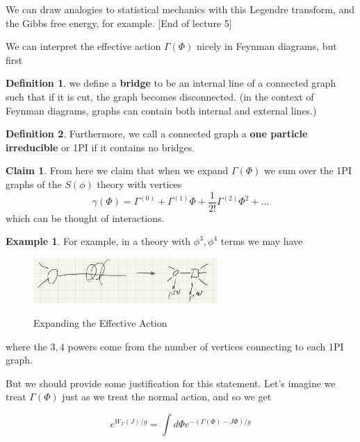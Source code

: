 \documentclass{article}
\theoremstyle{definition}
\newtheorem{definition}{Definition}
\newtheorem{example}{Example}
\newtheorem{claim}{Claim}
\begin{document}
We can draw analogies to statistical mechanics with this Legendre transform, and
the Gibbs free energy, for example. [End of lecture 5]

We can interpret the effective action $\Gamma(\Phi)$ nicely in Feynman diagrams,
but first

\begin{definition}
  we define a \textbf{bridge} to be an internal line of a connected graph such
  that if it is cut, the graph becomes disconnected.
  (in the context of Feynman diagrams, graphs can contain both internal and
  external lines.)
\end{definition}

\begin{definition}
  Furthermore, we call a connected graph a \textbf{one particle irreducible} or
  1PI if it contains no bridges.
\end{definition}

\begin{claim}
  From here we claim that when we expand $\Gamma(\Phi)$ we sum over the 1PI
  graphs of the $S(\phi)$ theory with vertices
  \begin{equation}
    \gamma(\Phi) = \Gamma^{(0)} + \Gamma^{(1)} \Phi +
    \frac{1}{2!} \Gamma^{(2)} \Phi^2 + \dots
  \end{equation}
  which can be thought of interactions.
\end{claim}

\begin{example}
  For example, in a theory with $\phi^3, \phi^4$ terms we may have
  \begin{figure}[H]
    \centering
    \includegraphics[width=7cm]{res/AQFT/lec_6_effective_action_expansion}
    \label{lec_6_effective_action_expansion}
    \caption{Expanding the Effective Action}
  \end{figure}
  where the $3, 4$ powers come from the number of vertices connecting to each
  1PI graph.
\end{example}

But we should provide some justification for this statement. Let's imagine we
treat $\Gamma(\Phi)$ just as we treat the normal action, and so we get

\begin{equation}
  e^{W_\Gamma(J) / g} = \int d\Phi e^{-(\Gamma(\Phi) - J \Phi) / g}
\end{equation}
\end{document}
